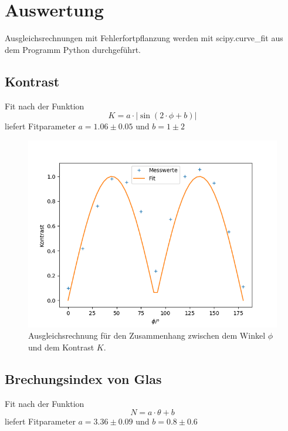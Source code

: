 \section{Auswertung}

Ausgleichsrechnungen mit Fehlerfortpflanzung werden mit scipy.curve\_fit aus dem Programm Python
durchgeführt.

\subsection{Kontrast}

Fit nach der Funktion
\[
K = a \cdot | \sin (2 \cdot \phi + b) |
\]
liefert Fitparameter $a = 1.06 \pm 0.05$ und $b = 1 \pm 2$

\begin{figure}[h]
\centering
\includegraphics[width=\linewidth]{img/kontrast.png}
\caption{Ausgleichsrechnung für den Zusammenhang zwischen dem Winkel $\phi$ und dem Kontrast $K$.}
\label{kontrast}
\end{figure}

\subsection{Brechungsindex von Glas}

Fit nach der Funktion
\[
N = a \cdot \theta + b
\]
liefert Fitparameter $a = 3.36 \pm 0.09$ und $b = 0.8 \pm 0.6$

